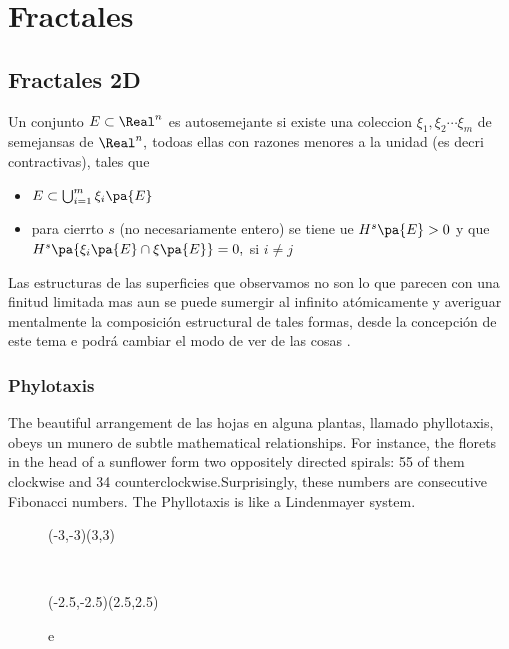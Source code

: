 \chapter{Fractales}

\section{Fractales 2D}


Un conjunto $E\subset \Real^n$ es autosemejante si existe una coleccion $\xi_1,\xi_2 \cdots \xi_m$ de semejansas de $\Real^n,$ todoas ellas con razones menores a la unidad (es decri contractivas), tales que

\begin{itemize}
	\item $E\subset \bigcup^m_{i=1}\xi_i\pa{E}$
	\item para cierrto $s$ (no necesariamente entero) se tiene ue $H^s\pa{E}>0$ y que $H^s\pa{\xi_i\pa{E}\cap \xi\pa{E}}=0,$ si $i\neq j$
\end{itemize}

Las estructuras de las superficies que observamos no son lo que parecen con una finitud limitada mas aun se puede sumergir al infinito atómicamente y averiguar mentalmente la composición estructural de tales formas, desde  la concepción de este tema e podrá cambiar el modo de ver de las cosas .

\subsection{Phylotaxis}
The beautiful arrangement de las hojas en alguna plantas, llamado phyllotaxis, obeys un munero de subtle mathematical relationships. For instance, the florets in the head of a sunflower form two oppositely directed spirals: 55 of them clockwise and 34 counterclockwise.Surprisingly, these numbers are consecutive Fibonacci numbers. The Phyllotaxis is like a Lindenmayer system.


\begin{figure}[!ht]
	\begin{center}
		\begin{pspicture}[showgrid=true](-3,-3)(3,3)
			\psPhyllotaxis[c=4,angle=111]
		\end{pspicture}
		\,
		\begin{pspicture}[showgrid=true](-2.5,-2.5)(2.5,2.5)
			\psPhyllotaxis[angle=99]
		\end{pspicture}
	\end{center}
	\caption{e}
\end{figure}


